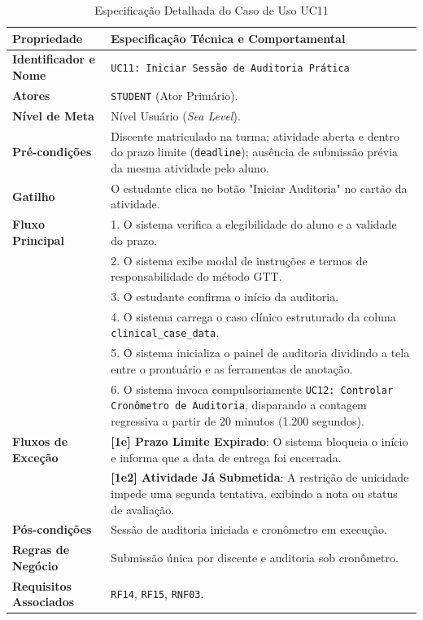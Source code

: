 \begin{table}[!ht]
\centering
\caption{Especificação Detalhada do Caso de Uso UC11}
\label{tab_uc11}
\footnotesize
\begin{tabularx}{\textwidth}{p{3.5cm} X}
\toprule
\textbf{Propriedade} & \textbf{Especificação Técnica e Comportamental} \\
\midrule
\textbf{Identificador e Nome} & \texttt{UC11: Iniciar Sessão de Auditoria Prática} \\
\textbf{Atores} & \texttt{STUDENT} (Ator Primário). \\
\textbf{Nível de Meta} & Nível Usuário (\textit{Sea Level}). \\
\textbf{Pré-condições} & Discente matriculado na turma; atividade aberta e dentro do prazo limite (\texttt{deadline}); ausência de submissão prévia da mesma atividade pelo aluno. \\
\textbf{Gatilho} & O estudante clica no botão "Iniciar Auditoria" no cartão da atividade. \\
\textbf{Fluxo Principal} & 
1. O sistema verifica a elegibilidade do aluno e a validade do prazo.\\
& 2. O sistema exibe modal de instruções e termos de responsabilidade do método GTT.\\
& 3. O estudante confirma o início da auditoria.\\
& 4. O sistema carrega o caso clínico estruturado da coluna \texttt{clinical\_case\_data}.\\
& 5. O sistema inicializa o painel de auditoria dividindo a tela entre o prontuário e as ferramentas de anotação.\\
& 6. O sistema invoca compulsoriamente \texttt{UC12: Controlar Cronômetro de Auditoria}, disparando a contagem regressiva a partir de 20 minutos (1.200 segundos). \\
\textbf{Fluxos de Exceção} & 
\textbf{[1e] Prazo Limite Expirado}: O sistema bloqueia o início e informa que a data de entrega foi encerrada.\\
& \textbf{[1e2] Atividade Já Submetida}: A restrição de unicidade impede uma segunda tentativa, exibindo a nota ou status de avaliação. \\
\textbf{Pós-condições} & Sessão de auditoria iniciada e cronômetro em execução. \\
\textbf{Regras de Negócio} & Submissão única por discente e auditoria sob cronômetro. \\
\textbf{Requisitos Associados} & \texttt{RF14}, \texttt{RF15}, \texttt{RNF03}. \\
\bottomrule
\end{tabularx}
\end{table}

